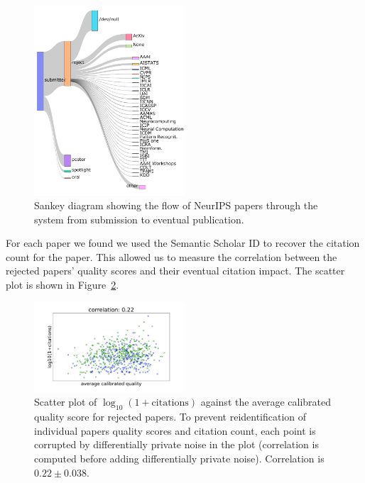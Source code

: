 \documentclass[twoside]{article}
\begin{document}
\begin{figure}[htb]
\centering
\includegraphics[width=0.5\textwidth]{diagrams/neurips/where-do-neurips-papers-go.pdf}

\caption{Sankey diagram showing the flow of NeurIPS papers through the system from submission to eventual publication.}
\label{figure-where-do-neurips-papers-go}
\end{figure}

For each paper we found we used the Semantic Scholar ID to recover the
citation count for the paper. This allowed us to measure the
correlation between the rejected papers' quality scores and their
eventual citation impact. The scatter plot is shown in Figure~\ref{figure-citations-vs-average-calibrated-quality-reject}.

\begin{figure}[htb]
\begin{center}
\includegraphics[width=0.5\textwidth]{diagrams/neurips/citations-vs-average-calibrated-quality-reject.pdf}
\end{center}
\caption{Scatter plot of $\log_{10}(1+\text{citations})$ against the
  average calibrated quality score for rejected papers. To prevent
  reidentification of individual papers quality scores and citation
  count, each point is corrupted by differentially private noise in
  the plot (correlation is computed before adding differentially
  private noise). Correlation is $0.22 \pm 0.038$. }
\label{figure-citations-vs-average-calibrated-quality-reject}
\end{figure}
\end{document}
